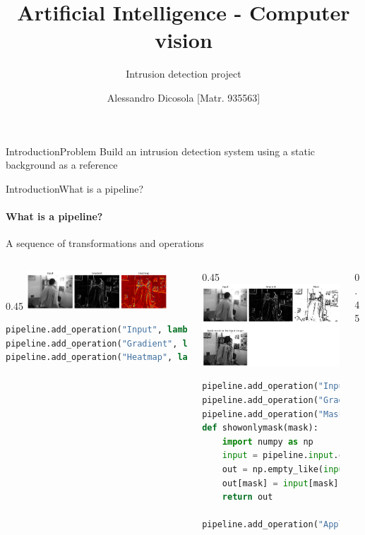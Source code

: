 \documentclass{beamer}
\institute{Alma Mater Studiorum \\ University of Bologna}
\title{Artificial Intelligence - Computer vision}
\subtitle{Intrusion detection project}
\author{Alessandro Dicosola [Matr. 935563]}
\date{}
\begin{document}
 
\begin{frame}
    \titlepage
\end{frame}

\begin{frame}{Introduction}{Problem}
    Build an intrusion detection system using a static background as a reference
\end{frame}
\begin{frame}[fragile]{Introduction}{What is a pipeline?}
    \framesubtitle{What is a pipeline?}
    A sequence of transformations and operations
    \begin{columns}
        \begin{column}[t]{0.45\textwidth}
            \centering
            \includegraphics[width=150pt,keepaspectratio]{pipelineex1.png}
            \begin{lstlisting}[basicstyle=\tiny,breaklines=true,linewidth=150pt,language=Python]
pipeline.add_operation("Input", lambda frame: frame)
pipeline.add_operation("Gradient", lambda frame: get_grad(frame))
pipeline.add_operation("Heatmap", lambda frame: cv2.applyColorMap(frame, cv2.COLORMAP_JET))
            \end{lstlisting}
        \end{column}
        \begin{column}[t]{0.45\textwidth}
            \includegraphics[width=150pt,keepaspectratio]{pipelineex2.png}
            \begin{lstlisting}[basicstyle=\tiny,breaklines=true,linewidth=150pt,language=Python]
pipeline.add_operation("Input", lambda frame: frame)
pipeline.add_operation("Gradient", lambda frame: get_grad(frame))
pipeline.add_operation("Mask", lambda frame: frame < 30)
def showonlymask(mask):
    import numpy as np
    input = pipeline.input.copy()
    out = np.empty_like(input)
    out[mask] = input[mask]
    return out

pipeline.add_operation("Apply mask on the input image", showonlymask)
            \end{lstlisting}
        \end{column}
        \begin{column}[t]{0.45\textwidth}
            
        \end{column}
    \end{columns}
\end{frame}
\end{document}
